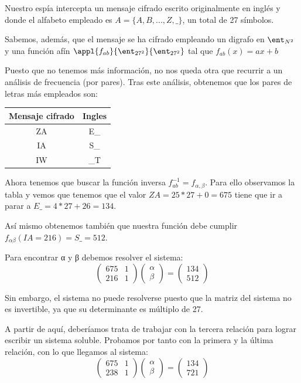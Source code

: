 \begin{example}
Nuestro espía intercepta un mensaje cifrado escrito originalmente en inglés y donde el alfabeto empleado es $A=\{A,B,...,Z,\_\}$, un total de 27 símbolos.

Sabemos, además, que el mensaje se ha cifrado empleando un digrafo en $\ent_{N^2}$ y una función afín $\appl{f_{ab}}{\ent_{27^2}}{\ent_{27^2}}$ tal que $f_{ab}(x)=ax+b$

Puesto que no tenemos más información, no nos queda otra que recurrir a un análisis de frecuencia (por pares). Tras este análisis, obtenemos que los pares de letras más empleados son:
\begin{center}
\begin{tabular}{| c | c |}
\hline
\textbf{Mensaje cifrado} & \textbf{Ingles} \\
\hline
ZA & E\_\\
\hline
IA & S\_\\
\hline
IW & \_T \\
\hline
\end{tabular}
\end{center}

Ahora tenemos que buscar la función inversa $f^{-1}_{ab} = f_{α,β}$. Para ello observamos la tabla y vemos que tenemos que el valor $ZA = 25*27+0 = 675$ tiene que ir a parar a $E\_=4*27+26=134$.

Así mismo obtenemos también que nuestra función debe cumplir $f_{αβ}(IA = 216)=S\_ = 512$.

Para encontrar α y β debemos resolver el sistema:
\[\left( \begin{array}{cc}
675 & 1 \\
216 & 1  \end{array} \right)\left( \begin{array}{c}
α \\
β  \end{array} \right) = \left( \begin{array}{c}
134 \\
512  \end{array} \right)\]

Sin embargo, el sistema no puede resolverse puesto que la matriz del sistema no es invertible, ya que su determinante es múltiplo de 27.

A partir de aquí, deberíamos trata de trabajar con la tercera relación para lograr escribir un sistema soluble. Probamos por tanto con la primera y la última relación, con lo que llegamos al sistema:
\[\left( \begin{array}{cc}
675 & 1 \\
238 & 1  \end{array} \right)\left( \begin{array}{c}
α \\
β  \end{array} \right) = \left( \begin{array}{c}
134 \\
721  \end{array} \right)\]


\end{example}
